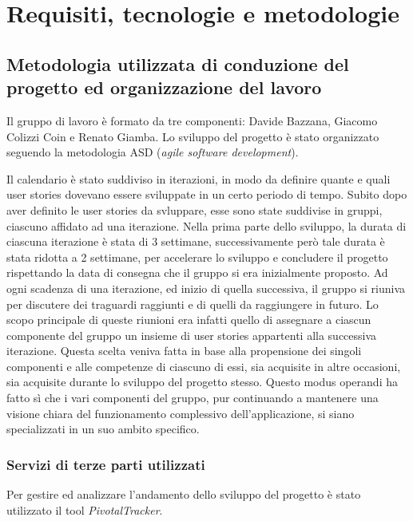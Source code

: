 \chapter{Requisiti, tecnologie e metodologie}

\section{Metodologia utilizzata di conduzione del progetto ed organizzazione del lavoro}

Il gruppo di lavoro è formato da tre componenti: Davide Bazzana,
Giacomo Colizzi Coin e Renato Giamba.
\newline
\newline
Lo sviluppo del progetto è stato organizzato seguendo la metodologia
ASD (\textit{agile software development}).

Il calendario è stato suddiviso in iterazioni, in modo da definire
quante e quali user stories dovevano essere sviluppate in un certo
periodo di tempo. Subito dopo aver definito le user stories da
svluppare, esse sono state suddivise in gruppi, ciascuno affidato ad
una iterazione. Nella prima parte dello sviluppo, la durata di
ciascuna iterazione è stata di 3 settimane, successivamente però tale
durata è stata ridotta a 2 settimane, per accelerare lo sviluppo e
concludere il progetto rispettando la data di consegna che il gruppo
si era inizialmente proposto.  Ad ogni scadenza di una iterazione, ed
inizio di quella successiva, il gruppo si riuniva per discutere dei
traguardi raggiunti e di quelli da raggiungere in futuro. Lo scopo
principale di queste riunioni era infatti quello di assegnare a
ciascun componente del gruppo un insieme di user stories appartenti
alla successiva iterazione.  Questa scelta veniva fatta in base alla
propensione dei singoli componenti e alle competenze di ciascuno di
essi, sia acquisite in altre occasioni, sia acquisite durante lo
sviluppo del progetto stesso. Questo modus operandi ha fatto sì che i
vari componenti del gruppo, pur continuando a mantenere una visione
chiara del funzionamento complessivo dell'applicazione, si siano
specializzati in un suo ambito specifico.

\subsection{Servizi di terze parti utilizzati}

Per gestire ed analizzare l'andamento dello sviluppo del progetto è
stato utilizzato il tool \textit{PivotalTracker}.

